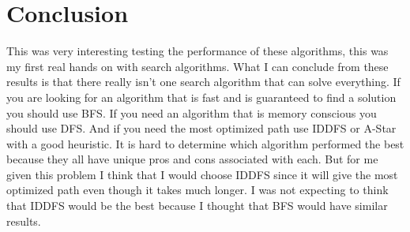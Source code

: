 \documentclass[letterpaper,11pt,notitlepage,fleqn]{article}
\begin{document}
\section{Conclusion}
This was very interesting testing the performance of these algorithms, this was my first real hands on with search algorithms. What I can conclude from these results is that there really isn't one search algorithm that can solve everything. If you are looking for an algorithm that is fast and is guaranteed to find a solution you should use BFS. If you need an algorithm that is memory conscious you should use DFS. And if you need the most optimized path use IDDFS or A-Star with a good
heuristic. It is hard to determine which algorithm performed the best because they all have unique pros and cons associated with each. But for me given this problem I think that I would choose IDDFS since it will give the most optimized path even though it takes much longer. I was not expecting to think that IDDFS would be the best because I thought that BFS would have similar results. 
 
\end{document}
